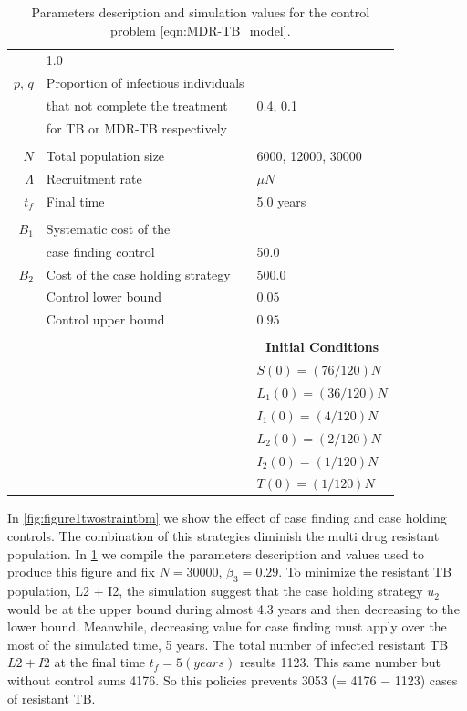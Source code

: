 \begin{table}
\begin{tabular}{rll}
			& \num{1.0}
     	    \\
     	    $p$, $q$
     	    & Proportion of infectious individuals 
     	    \\
     	    & that not complete the treatment  
     	    & \num{0.4}, \num{0.1}
     	    \\
     	    & for TB or MDR-TB respectively
		\\
		\\	
			$N$ 
			& Total population size
			& 
			\num{6000}, 
			\num{12000}, 
			\num{30000}
            \\
			$\Lambda$ 
				& Recruitment rate
				& $\mu N$
            \\
            $t_f$ 
            & Final time 
            & \num{5.0} years
      \\
      \\
     	    $B_1$ 
     	    & Systematic cost of the 
     	    \\
     	    & case finding  control
     	    & \num{50.0}
			\\
     	    $B_2$
     	    & 
     	    Cost of the case holding strategy
     	    & \num{500.0}
     	    \\
     	    & Control lower bound  & $0.05$
			\\
            & Control upper bound & $0.95$
       		\\
       		\\
		&&\multicolumn{1}{c}{\textbf{Initial Conditions}}
		\\
		\cmidrule{3-3}
		&&	
		$S(0) = (76/120)N$
		\\
		&&
		$L_1(0) = (36/120) N$
		\\
		&&
		$I_1(0) = (4/120)N$
		\\
		&&
		$L_2(0) =(2/120) N$
		\\
		&&
		$I_2(0) = (1/120)N$
		\\
		&&
		$T(0)= (1/120)N$
		\\
		\bottomrule
    \end{tabular}
	\caption{Parameters description and simulation values for the control 
	problem \eqref{eqn:MDR-TB_model}.}
	\label{tbl:parameters_MDR-TB_model}
\end{table}


	In \cref{fig:figure1twostraintbm} we show the effect of case finding and 
case holding controls. The combination of this strategies diminish the multi 
drug resistant population. In \cref{tbl:parameters_MDR-TB_model} we compile the 
parameters description and values used to produce this figure and fix 
$N = \num{30000}$, $\beta_3 = \num{0.29}$. To minimize the resistant TB 
population, L2 + I2, the simulation suggest that the case holding strategy 
$u_2$ would be at the upper bound during almost \num{4.3} years and then 
decreasing to the lower bound. Meanwhile, decreasing value for case finding
must apply over the most of the simulated time, 5 years. The total number of 
infected resistant TB $L2 + I2$  at the final time $t_f = 5(years)$ results
\num{1123}. This same number but without control sums 4176. So this policies 
prevents  \num{3053} (= 4176 − 1123) cases of resistant TB.


